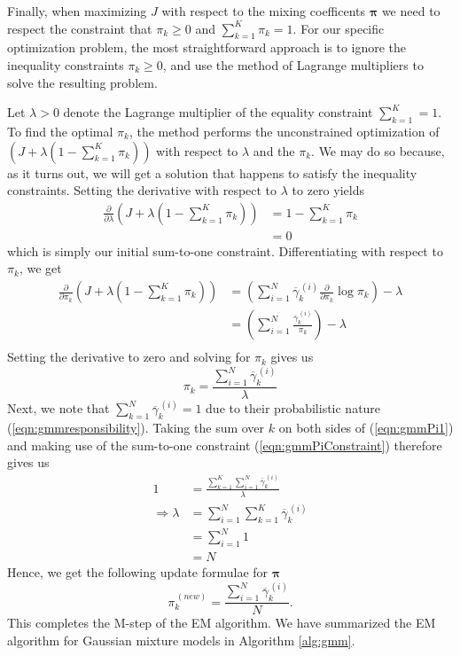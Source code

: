 \documentclass[final,3p,times,twocolumn]{elsarticle}
\let\bs\boldsymbol
\let\ol\overline
\begin{document}
Finally, when maximizing $J$ with respect to the mixing coefficents $\bs\pi$ we need to respect the constraint that $\pi_k \geq 0$ and $\sum_{k=1}^K \pi_k = 1$.
For our specific optimization problem, the most straightforward approach is to ignore the inequality constraints $\pi_k\geq 0$, and use the method of Lagrange multipliers to solve the resulting problem. 

Let $\lambda > 0$ denote the Lagrange multiplier of the equality constraint $\sum_{k=1}^K=1$.
To find the optimal $\pi_k$, the method performs the unconstrained optimization of $\left(J + \lambda(1-\sum_{k=1}^K \pi_k)\right)$ with respect to $\lambda$ and the $\pi_k$. We may do so because, as it turns out, we will get a solution that happens to satisfy the inequality constraints.
Setting the derivative with respect to $\lambda$ to zero yields
\begin{equation}
\begin{split}
\label{eqn:gmmPiConstraint}
\frac{\partial}{\partial \lambda}\left(J + \lambda(1 - \sum_{k=1}^K \pi_k)\right) &= 1 - \sum_{k=1}^K \pi_k\\
&= 0
\end{split}
\end{equation}
which is simply our initial sum-to-one constraint.
Differentiating with respect to $\pi_k$, we get
\begin{equation*}
\begin{split}
\frac{\partial}{\partial \pi_k}\left(J + \lambda(1 - \sum_{k=1}^K \pi_k)\right) &= \left(\sum_{i=1}^N\ol\gamma_k^{\,(i)} \frac{\partial}{\partial \pi_k} \log \pi_k\right) - \lambda\\
&= \left(\sum_{i=1}^N \frac{\ol\gamma_k^{\,(i)}}{\pi_k}\right) - \lambda \\
\end{split}
\end{equation*}
Setting the derivative to zero and solving for $\pi_k$ gives us
\begin{equation}
\label{eqn:gmmPi1}
\pi_k = \frac{\sum_{i=1}^N\ol\gamma_k^{\,(i)}}{\lambda}
\end{equation}
Next, we note that $\sum_{k=1}^N \ol\gamma_k^{\,(i)} = 1$ due to their probabilistic nature (\ref{eqn:gmmresponsibility}).
Taking the sum over $k$ on both sides of (\ref{eqn:gmmPi1}) and making use of the sum-to-one constraint (\ref{eqn:gmmPiConstraint}) therefore gives us
\begin{equation*}
\label{eqn:gmmPi2}
\begin{split}
1 &= \frac{\sum_{k=1}^K \sum_{i=1}^N \ol\gamma_k^{\,(i)}}{\lambda}\\
\Rightarrow \lambda &= \sum_{i=1}^N \sum_{k=1}^K \ol\gamma_k^{\,(i)}\\
&= \sum_{i=1}^N 1 \\
&= N
\end{split}
\end{equation*}
Hence, we get the following update formulae for $\bs\pi$
\begin{equation}
\label{eqn:gmmPi}
\pi_k^{\,(new)} = \frac{\sum_{i=1}^N \ol\gamma_k^{\,(i)}}{N}.
\end{equation}
This completes the M-step of the EM algorithm.
We have summarized the EM algorithm for Gaussian mixture models in Algorithm \ref{alg:gmm}.
\end{document}
